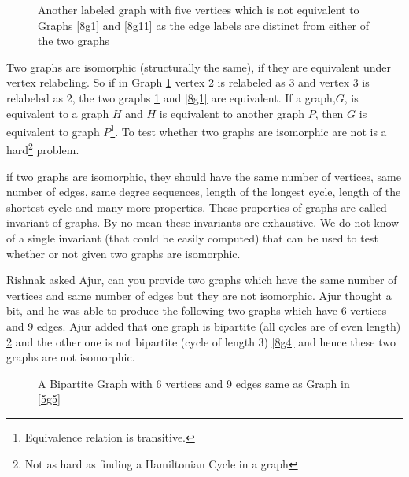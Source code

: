 \begin{figure}
\begin{center}
\caption{ Another labeled graph with five vertices which is not equivalent to Graphs \ref{8g1} and \ref{8g11} as the edge labels are distinct from either of the two graphs}\label{8g2}
\end{center}
\end{figure}

Two graphs are isomorphic (structurally the same), if they are equivalent under vertex relabeling. So if in Graph \ref{8g2} vertex 2 is relabeled as 3 and vertex 3 is relabeled as 2, the two graphs \ref{8g2} and \ref{8g1} are equivalent. If a graph,$G$, is equivalent to a graph $H$ and $H$ is equivalent to another graph $P$, then $G$ is equivalent to graph $P$\footnote{Equivalence relation is transitive.}. To test whether two graphs are isomorphic are not is a hard\footnote{Not as hard as finding a Hamiltonian Cycle in a graph} problem.

if two graphs are isomorphic, they should have the same number of vertices, same number of edges, same degree sequences, length of the longest cycle, length of the shortest cycle and many more properties.  These properties of graphs are called invariant of graphs. By no mean these invariants are exhaustive. We do not know of a single invariant (that could be easily computed) that can be used to test whether or not given two  graphs are isomorphic. 

Rishnak asked Ajur, can you provide two graphs which have the same number of vertices and same number of edges but they are not isomorphic. Ajur thought a bit, and he was able to produce the following two graphs which have 6 vertices and 9 edges. Ajur added that one graph is bipartite (all cycles are of even length) \ref{8g3} and the other one is not bipartite (cycle of length 3) \ref{8g4} and hence these two graphs are not isomorphic.

\begin{figure}

\caption{ A Bipartite Graph with 6 vertices and 9 edges same as Graph in \ref{5g5}}\label{8g3}

\end{figure}

